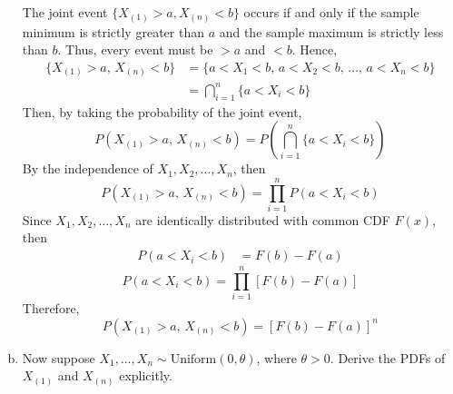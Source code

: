 \documentclass[letterpaper,12pt]{article}
\begin{document}
\begin{enumerate}[(a)]
\begin{list}{}{}
       The joint event $\{X_{(1)} > a, X_{(n)} < b\}$ occurs if and only if the sample minimum is strictly greater than $a$ and the sample maximum is strictly less than $b$. Thus, every event must be $> a$ and $< b$. Hence,
        \begin{align*}
        \{X_{(1)} > a, \, X_{(n)} < b\} &= \{a < X_1 < b, \, a < X_2 < b, \, \dots, \, a < X_n < b\} \\
        &= \bigcap_{i=1}^{n} \{a < X_i < b\}
        \end{align*}
        Then, by taking the probability of the joint event,
        \[        P(X_{(1)} > a, \, X_{(n)} < b) = P\left( \bigcap_{i=1}^{n} \{a < X_i < b\} \right)
        \]
        By the independence of $X_1, X_2, \dots, X_n$, then
        \[
        P(X_{(1)} > a, \, X_{(n)} < b) = \prod_{i=1}^{n} P(a < X_i < b)        \]
        Since $X_1, X_2, \dots, X_n$ are identically distributed with common CDF $F(x)$, then
        \begin{align*}
        P(a < X_i < b) &= F(b) - F(a) 
        \end{align*}
                \[  \boxed{P(a < X_i < b) = \prod_{i=1}^{n} [F(b) - F(a)]}\]
        Therefore,
        \[        P(X_{(1)} > a, \, X_{(n)} < b) = [F(b) - F(a)]^n        \]
    \end{list}
    \item Now suppose $X_1, \dots, X_n \sim \text{Uniform}(0, \theta)$, where $\theta > 0$. Derive the PDFs of $X_{(1)}$ and $X_{(n)}$ explicitly.
    \vspace{0.5em}
\end{enumerate}
\end{document}
